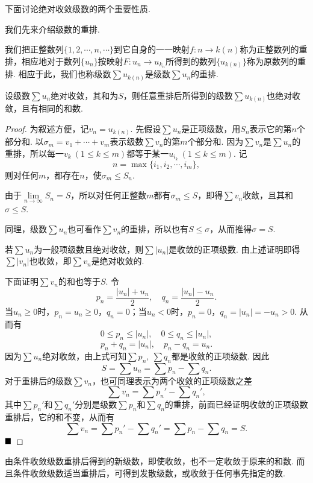 下面讨论绝对收敛级数的两个重要性质.

我们先来介绍级数的重排.
\begin{definition}[重排]
	我们把正整数列$\{1,2,\cdots,n,\cdots\}$到它自身的一一映射$f:n\to k(n)$称为{\heiti 正整数列的重排}，相应地对于数列$\{u_n\}$按映射$F:u_n\to u_{k_n}$所得到的数列$\{u_{k(n)}\}$称为{\heiti 原数列的重排}. 相应于此，我们也称级数$\sum u_{k(n)}$是级数$\sum u_n$的{\heiti 重排}.
\end{definition}
\begin{theorem}
	设级数$\sum u_n$绝对收敛，其和为$S$，则任意重排后所得到的级数$\sum u_{k(n)}$也绝对收敛，且有相同的和数.
\end{theorem}
\begin{proof}
	为叙述方便，记$v_n=u_{k(n)}$. 先假设$\sum u_n$是正项级数，用$S_n$表示它的第$n$个部分和. 以$\sigma_m=v_1+\cdots+v_m$表示级数$\sum v_n$的第$m$个部分和. 因为$\sum v_n$是$\sum u_n$的重排，所以每一$v_k\ (1\leqslant k\leqslant m)$都等于某一$u_{i_k}\ (1\leqslant k\leqslant m)$. 记
	$$n=\max\{i_1,i_2,\cdots,i_m\},$$
	则对任何$m$，都存在$n$，使$\sigma_m\leqslant S_n$.
	
	由于$\lim\limits_{n\to\infty}S_n=S$，所以对任何正整数$m$都有$\sigma_m\leqslant S$，即得$\sum v_n$收敛，且其和$\sigma\leqslant S$.
	
	同理，级数$\sum u_n$也可看作$\sum v_n$的重排，所以也有$S\leqslant\sigma$，从而推得$\sigma=S$.
	
	若$\sum u_n$为一般项级数且绝对收敛，则$\sum |u_n|$是收敛的正项级数. 由上述证明即得$\sum |v_n|$也收敛，即$\sum v_n$是绝对收敛的.
	
	下面证明$\sum v_n$的和也等于$S$. 令
	$$p_n=\frac{|u_n|+u_n}{2},\quad q_n=\frac{|u_n|-u_n}{2}.$$
	当$u_n\geqslant 0$时，$p_n=u_n\geqslant 0$，$q_n=0$；当$u_n<0$时，$p_n=0$，$q_n=|u_n|=-u_n>0$. 从而有
	$$0\leqslant p_n\leqslant |u_n|,\quad 0\leqslant q_n\leqslant |u_n|,$$
	$$p_n+q_n=|u_n|,\quad p_n-q_n=u_n.$$
	因为$\sum u_n$绝对收敛，由上式可知$\sum p_n,\ \sum q_n$都是收敛的正项级数. 因此
	$$S=\sum u_n=\sum p_n-\sum q_n.$$
	对于重排后的级数$\sum v_n$，也可同理表示为两个收敛的正项级数之差
	$$\sum v_n=\sum p_n'-\sum q_n',$$
	其中$\sum p_n'$和$\sum q_n'$分别是级数$\sum p_n$和$\sum q_n$的重排，前面已经证明收敛的正项级数重排后，它的和不变，从而有
	$$\sum v_n=\sum p_n'-\sum q_n'=\sum p_n-\sum q_n=S.$$
	$\hfill\blacksquare$
\end{proof}
\begin{remark}
	由条件收敛级数重排后得到的新级数，即使收敛，也不一定收敛于原来的和数. 而且条件收敛级数适当重排后，可得到发散级数，或收敛于任何事先指定的数.
\end{remark}

